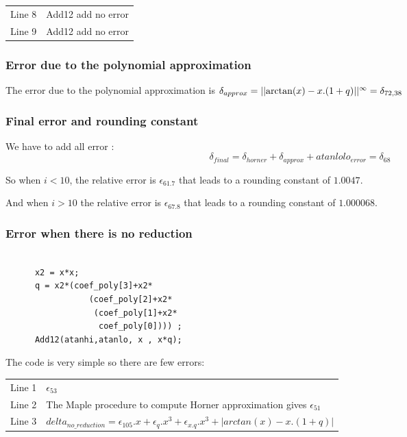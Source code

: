 \begin{tabular}{ll}
Line 8 & Add12 add no error\\
Line 9 & Add12 add no error
\end{tabular}

\bigskip

\subsubsection {Error due to the polynomial approximation}

The error due to the polynomial approximation is $\delta_{approx} =
||{ \arctan(x) - x.(1+q)}||^{\infty}= \delta_{72,38}$ 

\subsubsection {Final error and rounding constant}

We have to add all error : 
\begin{equation}
\delta_{final} = \delta_{horner} + \delta_{approx} + atanlolo_{error} = \delta_{68}
\end{equation}

So when $i < 10$, the relative error is $\epsilon_{61.7}$ that leads to a
rounding constant of $1.0047$.

And when $i > 10$ the relative error is $\epsilon_{67.8}$ that leads to a
rounding constant of $1.000068$.

\subsubsection{Error when there is no reduction}
\begin{lstlisting}[caption={No reduction},firstnumber=1]

      x2 = x*x;
      q = x2*(coef_poly[3]+x2*
                 (coef_poly[2]+x2*
                  (coef_poly[1]+x2*
                   coef_poly[0]))) ;
      Add12(atanhi,atanlo, x , x*q);

\end{lstlisting}

The code is very simple so there are few errors:

\begin{tabular}{ll}
Line 1 & $\epsilon_{53}$ \\
Line 2 & The Maple procedure to compute Horner approximation gives $\epsilon_{51}$\\
Line 3 & $delta_{no\_reduction} = \epsilon_{105}.x + \epsilon_q.x^3 + 
\epsilon_{x.q}.x^3 + |arctan(x) - x.(1+q)| $
\end{tabular}

